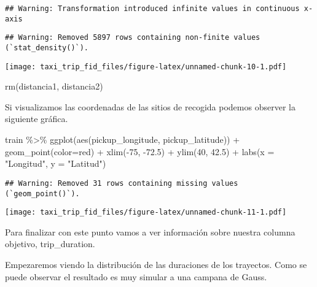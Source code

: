 \documentclass[
]{article}
\newenvironment{Shaded}{\begin{snugshade}}{\end{snugshade}}
\newcommand{\AttributeTok}[1]{\textcolor[rgb]{0.77,0.63,0.00}{#1}}
\newcommand{\DecValTok}[1]{\textcolor[rgb]{0.00,0.00,0.81}{#1}}
\newcommand{\FloatTok}[1]{\textcolor[rgb]{0.00,0.00,0.81}{#1}}
\newcommand{\FunctionTok}[1]{\textcolor[rgb]{0.00,0.00,0.00}{#1}}
\newcommand{\NormalTok}[1]{#1}
\newcommand{\SpecialCharTok}[1]{\textcolor[rgb]{0.00,0.00,0.00}{#1}}
\newcommand{\StringTok}[1]{\textcolor[rgb]{0.31,0.60,0.02}{#1}}
\begin{document}
\begin{verbatim}
## Warning: Transformation introduced infinite values in continuous x-axis
\end{verbatim}

\begin{verbatim}
## Warning: Removed 5897 rows containing non-finite values (`stat_density()`).
\end{verbatim}

\texttt{[image: taxi\_trip\_fid\_files/figure-latex/unnamed-chunk-10-1.pdf]}

\begin{Shaded}
\begin{Highlighting}[]
\FunctionTok{rm}\NormalTok{(distancia1, distancia2)}
\end{Highlighting}
\end{Shaded}

Si visualizamos las coordenadas de las sitios de recogida podemos
observer la siguiente gráfica.

\begin{Shaded}
\begin{Highlighting}[]
\NormalTok{train }\SpecialCharTok{\%\textgreater{}\%}
  \FunctionTok{ggplot}\NormalTok{(}\FunctionTok{aes}\NormalTok{(pickup\_longitude, pickup\_latitude)) }\SpecialCharTok{+}
  \FunctionTok{geom\_point}\NormalTok{(}\AttributeTok{color=}\StringTok{\textquotesingle{}red\textquotesingle{}}\NormalTok{) }\SpecialCharTok{+}
  \FunctionTok{xlim}\NormalTok{(}\SpecialCharTok{{-}}\DecValTok{75}\NormalTok{, }\SpecialCharTok{{-}}\FloatTok{72.5}\NormalTok{) }\SpecialCharTok{+}
  \FunctionTok{ylim}\NormalTok{(}\DecValTok{40}\NormalTok{, }\FloatTok{42.5}\NormalTok{) }\SpecialCharTok{+}
  \FunctionTok{labs}\NormalTok{(}\AttributeTok{x =} \StringTok{"Longitud"}\NormalTok{, }\AttributeTok{y =} \StringTok{"Latitud"}\NormalTok{)}
\end{Highlighting}
\end{Shaded}

\begin{verbatim}
## Warning: Removed 31 rows containing missing values (`geom_point()`).
\end{verbatim}

\texttt{[image: taxi\_trip\_fid\_files/figure-latex/unnamed-chunk-11-1.pdf]}

Para finalizar con este punto vamos a ver información sobre nuestra
columna objetivo, trip\_duration.

Empezaremos viendo la distribución de las duraciones de los trayectos.
Como se puede observar el resultado es muy simular a una campana de
Gauss.
\end{document}
